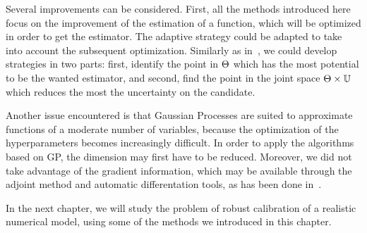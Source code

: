 \documentclass[../../Main_ManuscritThese.tex]{subfiles}
\begin{document}
Several improvements can be considered. First, all the methods
introduced here focus on the improvement of the estimation of a
function, which will be optimized in order to get the estimator. The
adaptive strategy could be adapted to take into account the subsequent
optimization. Similarly as in~\cite{janusevskis_simultaneous_2010}, we
could develop strategies in two parts: first, identify the point in
$\Theta$ which has the most potential to be the wanted estimator, and
second, find the point in the joint space $\Theta \times \mathbb{U}$
which reduces the most the uncertainty on the candidate.

Another issue encountered is that Gaussian Processes are suited to
approximate functions of a moderate number of variables, because the
optimization of the hyperparameters becomes increasingly difficult. In
order to apply the algorithms based on GP, the dimension may first
have to be reduced. Moreover, we did not take advantage of the
gradient information, which may be available through the adjoint
method and automatic differentation tools, as has been done
in~\cite{bouhlel_gradient-enhanced_2019,laurent_overview_2019,miranda_adjoint-based_2016,pardalos_differentiating_2015}.

In the next chapter, we will study the problem of robust calibration
of a realistic numerical model, using some of the methods we
introduced in this chapter.


\vfill
\etoile
\vfill
\end{document}
